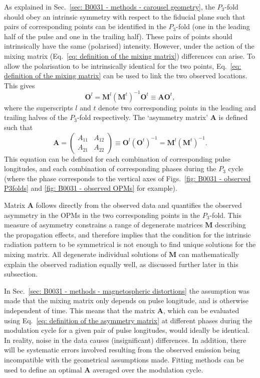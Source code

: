 As explained in Sec.~\ref{sec: B0031 - methods - carousel geometry}, the $P_3$-fold should obey an intrinsic symmetry with respect to the fiducial plane such that pairs of corresponding points can be identified in the $P_3$-fold (one in the leading half of the pulse and one in the trailing half). These pairs of points should intrinsically have the same (polarised) intensity. However, under the action of the mixing matrix (Eq.~\eqref{eq: definition of the mixing matrix}) differences can arise. To allow the polarisation to be intrinsically identical for the two points, Eq.~\eqref{eq: definition of the mixing matrix} can be used to link the two observed locations. This gives
\begin{equation}
    \label{eq: matching leading and trailing observed OPMs}
    \mathbf{O}^l = \mathbf{M}^l(\mathbf{M}^t)^{-1}\mathbf{O}^t \equiv \mathbf{A O}^t,
\end{equation}
where the superscripts $l$ and $t$ denote two corresponding points in the leading and trailing halves of the $P_3$-fold respectively. The `asymmetry matrix' $\mathbf{A}$ is defined such that
\begin{equation}
    \label{eq: definition of the asymmetry matrix}
    \mathbf{A}=\begin{pmatrix}A_{11} & A_{12}\\A_{21} & A_{22} \end{pmatrix}\equiv\mathbf{O}^l(\mathbf{O}^t)^{-1} = \mathbf{M}^l(\mathbf{M}^t)^{-1}.
\end{equation}
This equation can be defined for each combination of corresponding pulse longitudes, and each combination of corresponding phases during the $P_3$ cycle (where the phase corresponds to the vertical axes of Figs.~\ref{fig: B0031 - observed P3folds} and \ref{fig: B0031 - observed OPMs} for example).

Matrix $\mathbf{A}$ follows directly from the observed data and quantifies the observed asymmetry in the OPMs in the two corresponding points in the $P_3$-fold. This measure of asymmetry constrains a range of degenerate matrices $\mathbf{M}$ describing the propagation effects, and therefore implies that the condition for the intrinsic radiation pattern to be symmetrical is not enough to find unique solutions for the mixing matrix. All degenerate individual solutions  of $\mathbf{M}$ can mathematically explain the observed radiation equally well, as discussed further later in this subsection.

In Sec.~\ref{sec: B0031 - methods -  magnetospheric distortions} the assumption was made that the mixing matrix only depends on pulse longitude, and is otherwise independent of time. This means that the matrix $\mathbf{A}$, which can be evaluated using Eq.~\eqref{eq: definition of the asymmetry matrix} at different phases during the modulation cycle for a given pair of pulse longitudes, would ideally be identical. In reality, noise in the data causes (insignificant) differences. In addition, there will be systematic errors involved resulting from the observed emission being incompatible with the geometrical assumptions made. Fitting methods can be used to define an optimal $\mathbf{A}$ averaged over the modulation cycle.

